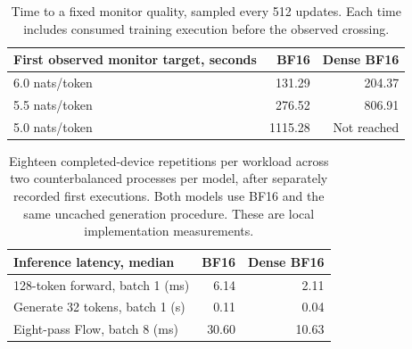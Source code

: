 \begin{table}[H]
\centering
\begin{tabularx}{\textwidth}{@{}Xrr@{}}
\toprule
First observed monitor target, seconds & \ModelName{} BF16 & Dense BF16\\
\midrule
6.0 nats/token & 131.29 & 204.37\\
5.5 nats/token & 276.52 & 806.91\\
5.0 nats/token & 1115.28 & Not reached\\
\bottomrule
\end{tabularx}
\caption{Time to a fixed monitor quality, sampled every 512 updates. Each time
includes consumed training execution before the observed crossing.}
\end{table}
\begin{table}[H]
\centering
\begin{tabularx}{\textwidth}{@{}Xrr@{}}
\toprule
Inference latency, median & \ModelName{} BF16 & Dense BF16\\
\midrule
128-token forward, batch 1 (ms) & 6.14 & 2.11\\
Generate 32 tokens, batch 1 (s) & 0.11 & 0.04\\
Eight-pass Flow, batch 8 (ms) & 30.60 & 10.63\\
\bottomrule
\end{tabularx}
\caption{Eighteen completed-device repetitions per workload across two
counterbalanced processes per model, after separately recorded first executions. Both models use BF16 and the same uncached generation
procedure. These are local implementation measurements.}
\end{table}

